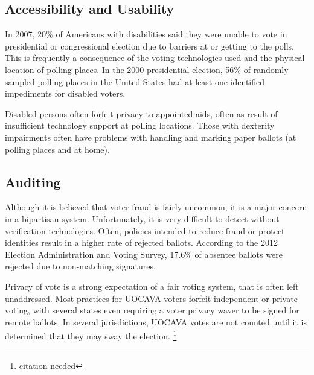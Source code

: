 \subsection{Accessibility and Usability}

In 2007, 20\% of Americans with disabilities said they were unable to vote in
presidential or congressional election due to barriers at or getting to the
polls. This is frequently a consequence of the voting technologies used and the
physical location of polling places. In the 2000 presidential election, 56\% of
randomly sampled polling places in the United States had at least one identified
impediments for disabled voters.

Disabled persons often forfeit privacy to appointed aids,%
often as result of insufficient technology support at polling locations.
Those with dexterity impairments often have problems with handling and marking
paper ballots (at polling places and at
home).


\subsection{Auditing}
Although it is believed that voter fraud is fairly uncommon, it is a major
concern in a bipartisan system. Unfortunately, it is very difficult to detect
without verification technologies. Often, policies intended to reduce fraud
or protect identities result in a higher rate of rejected ballots. According
to the 2012 Election Administration and Voting Survey, 17.6\% of absentee
ballots were rejected due to non-matching signatures.

Privacy of vote is a strong expectation of a fair voting system, that is often
left unaddressed. Most practices for UOCAVA voters forfeit independent or
private voting, with several states even requiring a voter privacy waver to be
signed for remote ballots. In several jurisdictions, UOCAVA votes are not
counted until it is determined that they may sway the election.
\footnote{citation needed}


